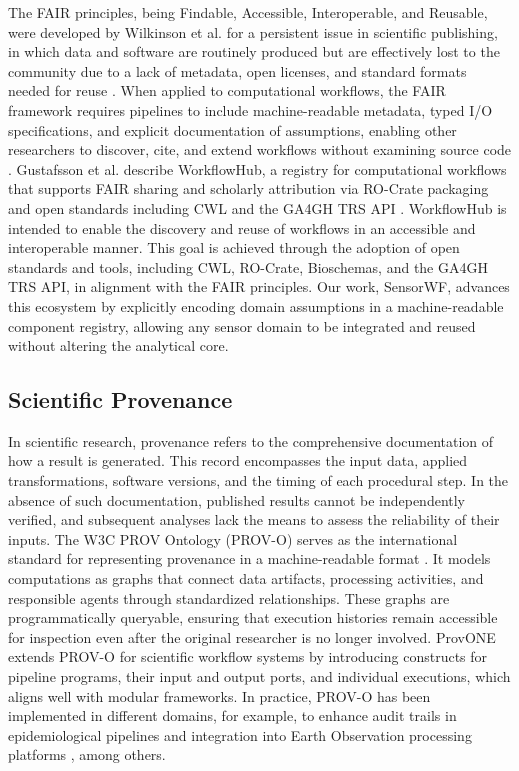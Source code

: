\documentclass[conference]{IEEEtran}
\begin{document}
The FAIR principles, being Findable, Accessible, Interoperable, and Reusable, were developed by Wilkinson et al. for a persistent issue in scientific publishing, in which data and software are routinely produced but are effectively lost to the community due to a lack of metadata, open licenses, and standard formats needed for reuse \cite{wilkinson2016fair}. When applied to computational workflows, the FAIR framework requires pipelines to include machine-readable metadata, typed I/O specifications, and explicit documentation of assumptions, enabling other researchers to discover, cite, and extend workflows without examining source code \cite{garijo2022fair}. Gustafsson et al. describe WorkflowHub, a registry for computational workflows that supports FAIR sharing and scholarly attribution via RO-Crate packaging and open standards including CWL and the GA4GH TRS API \cite{gustafsson2025workflowhub}. WorkflowHub is intended to enable the discovery and reuse of workflows in an accessible and interoperable manner. This goal is achieved through the adoption of open standards and tools, including CWL, RO-Crate, Bioschemas, and the GA4GH TRS API, in alignment with the FAIR principles. Our work, SensorWF, advances this ecosystem by explicitly encoding domain assumptions in a machine-readable component registry, allowing any sensor domain to be integrated and reused without altering the analytical core.

\subsection{Scientific Provenance}

In scientific research, provenance refers to the comprehensive documentation of how a result is generated. This record encompasses the input data, applied transformations, software versions, and the timing of each procedural step. In the absence of such documentation, published results cannot be independently verified, and subsequent analyses lack the means to assess the reliability of their inputs. The W3C PROV Ontology (PROV-O) serves as the international standard for representing provenance in a machine-readable format \cite{provo2013}. It models computations as graphs that connect data artifacts, processing activities, and responsible agents through standardized relationships. These graphs are programmatically queryable, ensuring that execution histories remain accessible for inspection even after the original researcher is no longer involved. ProvONE \cite{missier2013provone} extends PROV-O for scientific workflow systems by introducing constructs for pipeline programs, their input and output ports, and individual executions, which aligns well with modular frameworks. In practice, PROV-O has been implemented in different domains, for example, to enhance audit trails in epidemiological pipelines \cite{mitchell2022fair} and integration into Earth Observation processing platforms \cite{omidi2025openeo}, among others.
\end{document}
